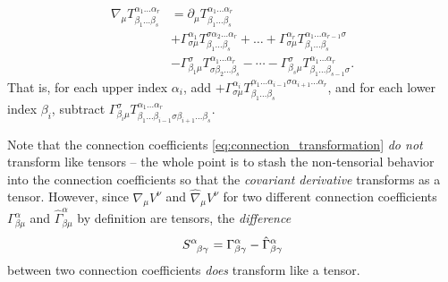 \begin{equation}
\begin{split}
	\nabla_\mu T^{\alpha_1 \ldots \alpha_r}_{\beta_1 \ldots \beta_s} &= \partial_\mu T^{\alpha_1 \ldots \alpha_r}_{\beta_1 \ldots \beta_s} \\
	                                                                 &+ \Gamma^{\alpha_1}_{\sigma\mu} T^{\sigma \alpha_2 \ldots \alpha_r}_{\beta_1 \ldots \beta_s} + \dots + \Gamma^{\alpha_r}_{\sigma\mu} T^{\alpha_1 \ldots \alpha_{r-1}\sigma}_{\beta_1 \ldots \beta_s} \\
	                                                                 &- \Gamma^\sigma_{\beta_1 \mu} T^{\alpha_1 \ldots \alpha_r}_{\sigma \beta_2 \ldots \beta_s} - \cdots - \Gamma^\sigma_{\beta_s \mu} T^{\alpha_1 \ldots \alpha_r}_{\beta_1 \ldots \beta_{s-1} \sigma} .
	\label{eq:def_cov_deriv}
\end{split}
\end{equation}
That is, for each upper index $\alpha_i$, add $+\Gamma^{\alpha_i}_{\sigma \mu} T^{\alpha_1 \ldots \alpha_{i-1} \sigma \alpha_{i+1} \ldots \alpha_r}_{\beta_1 \ldots \beta_s}$,
and for each lower index $\beta_i$, subtract $\Gamma^{\sigma}_{\beta_i \mu} T^{\alpha_1 \ldots \alpha_r}_{\beta_1 \ldots \beta_{i-1} \sigma \beta_{i+1} \ldots \beta_s}$.

Note that the connection coefficients \eqref{eq:connection_transformation} \emph{do not} transform like tensors -- the whole point is to stash the non-tensorial behavior into the connection coefficients so that the \emph{covariant derivative} transforms as a tensor.
However, since $\nabla_\mu V^\nu$ and $\hat{\nabla}_\mu V^\nu$ for two different connection coefficients $\Gamma^\alpha_{\beta \mu}$ and $\hat{\Gamma}^\alpha_{\beta \mu}$ by definition are tensors, the \emph{difference}
\begin{equation}
	S\indices{^\alpha_\beta_\gamma} = \Gamma^\alpha_{\beta \gamma} - \hat{\Gamma}^\alpha_{\beta \gamma}
\label{eq:gr_summary:christoffel_difference}
\end{equation}
between two connection coefficients \emph{does} transform like a tensor.

